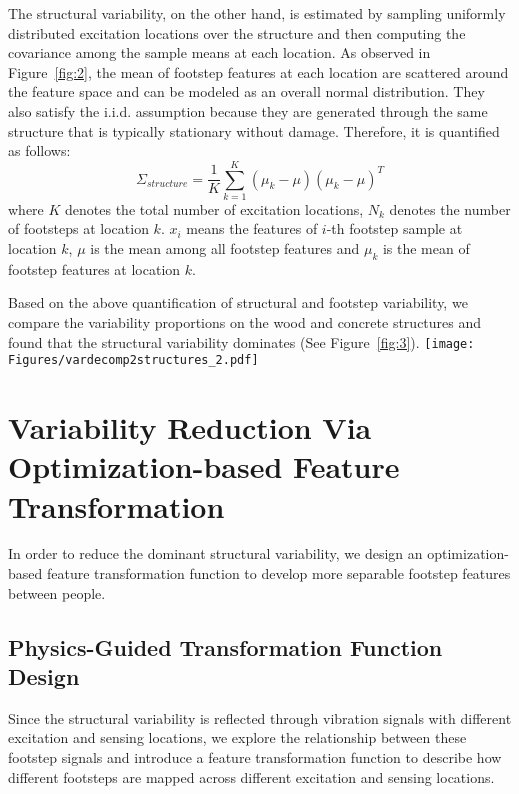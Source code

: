 \documentclass[11pt,letter]{article}
\begin{document}
\begin{multicols*}{2}
The structural variability, on the other hand, is estimated by sampling uniformly distributed excitation locations over the structure and then computing the covariance among the sample means at each location. As observed in Figure~\ref{fig:2}, the mean of footstep features at each location are scattered around the feature space and can be modeled as an overall normal distribution. They also satisfy the i.i.d. assumption because they are generated through the same structure that is typically stationary without damage. Therefore, it is quantified as follows:
\begin{equation}
    \Sigma_{structure} = \frac{1}{K} \sum_{k=1}^{K} (\mu_k - \mu)(\mu_k - \mu)^T
    \label{eq:structurevar}
\end{equation}
where $K$ denotes the total number of excitation locations, $N_k$ denotes the number of footsteps at location $k$. $x_i$ means the features of $i$-th footstep sample at location $k$, $\mu$ is the mean among all footstep features and $\mu_k$ is the mean of footstep features at location $k$.

Based on the above quantification of structural and footstep variability, we compare the variability proportions on the wood and concrete structures and found that the structural variability dominates (See Figure~\ref{fig:3}). 
\texttt{[image: Figures/vardecomp2structures\_2.pdf]}
\label{fig:3}

\section{Variability Reduction Via Optimization-based Feature Transformation}
In order to reduce the dominant structural variability, we design an optimization-based feature transformation function to develop more separable footstep features between people.

\subsection{Physics-Guided Transformation Function Design}
Since the structural variability is reflected through vibration signals with different excitation and sensing locations, we explore the relationship between these footstep signals and introduce a feature transformation function to describe how different footsteps are mapped across different excitation and sensing locations.


\end{multicols*}
\end{document}

